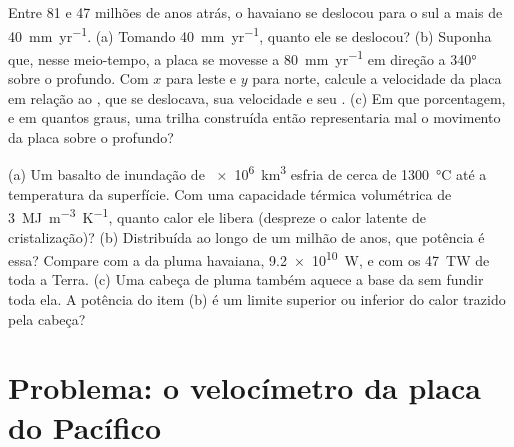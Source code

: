 \begin{exercise}[$\star\star\star$]\label{exo:b1:hotspots:11}
Entre 81 e 47 milhões de anos atrás, o  havaiano se deslocou para o sul a mais de \qty{40}{mm.yr^{-1}}. (a) Tomando \qty{40}{mm.yr^{-1}}, quanto ele se deslocou?
(b) Suponha que, nesse meio-tempo, a placa se movesse a \qty{80}{mm.yr^{-1}} em direção a \ang{340} sobre o  profundo. Com $x$ para leste e $y$ para norte, calcule a velocidade da placa em relação ao , que se deslocava, sua velocidade e seu . (c) Em que porcentagem, e em quantos graus, uma trilha construída então representaria mal o movimento da placa sobre o  profundo?
\end{exercise}

\begin{exercise}[$\star\star\star$]\label{exo:b1:hotspots:12}
(a) Um basalto de inundação de \qty{e6}{km^3} esfria de cerca de \qty{1300}{\celsius} até a temperatura da superfície. Com uma capacidade térmica volumétrica de \qty{3}{MJ.m^{-3}.K^{-1}}, quanto calor ele libera (despreze o calor latente de cristalização)? (b) Distribuída ao longo de um milhão de anos, que potência é essa? Compare com a da pluma havaiana, \qty{9.2e10}{W}, e com os \qty{47}{TW} de toda a Terra. (c) Uma cabeça de pluma também aquece a base da  sem fundir toda ela. A potência do item (b) é um limite superior ou inferior do calor trazido pela cabeça?
\end{exercise}

\section{Problema: o velocímetro da placa do Pacífico}


